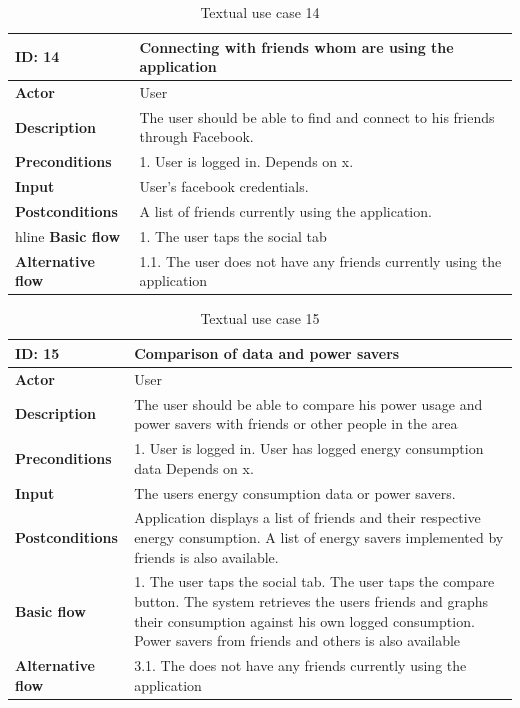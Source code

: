 \begin{table}[H]
\begin{tabular}{|l|p{11.7cm}|}
\hline
\textbf{ID: }14&\textbf{Connecting with friends whom are using the application}
\\\hline
\textbf{Actor} &User
\\\hline
\textbf{Description}&
The user should be able to find and connect to his friends through Facebook.\\\hline
\textbf{Preconditions}&
1. User is logged in.\newline
Depends on x.\\\hline
\textbf{Input}&
User's facebook credentials.\\\hline
\textbf{Postconditions}& 
A list of friends currently using the application.\\hline
\textbf{Basic flow}&
1. The user taps the social tab
\\\hline
\textbf{Alternative flow}&
1.1. The user does not have any friends currently using the application
\\\hline
\end{tabular}
\caption{Textual use case 14}
\end{table}


\begin{table}[H]
\begin{tabular}{|l|p{11.7cm}|}
\hline
\textbf{ID: }15&\textbf{Comparison of data and power savers}
\\\hline
\textbf{Actor} &User
\\\hline
\textbf{Description}&
The user should be able to compare his power usage and power savers with friends or other people in the area\\\hline
\textbf{Preconditions}&
1. User is logged in\newline
2. User has logged energy consumption data\newline
Depends on x.\\\hline
\textbf{Input}&
The users energy consumption data or power savers.\\\hline
\textbf{Postconditions}& 
Application displays a list of friends and their respective energy consumption. A list of energy savers implemented by friends is also available. \\\hline
\textbf{Basic flow}&
1. The user taps the social tab\newline
2. The user taps the compare button\newline
3. The system retrieves the users friends and graphs their consumption against his own logged consumption\newline
4. Power savers from friends and others is also available
\\\hline
\textbf{Alternative flow}&
3.1. The does not have any friends currently using the application
\\\hline
\end{tabular}
\caption{Textual use case 15}
\end{table}